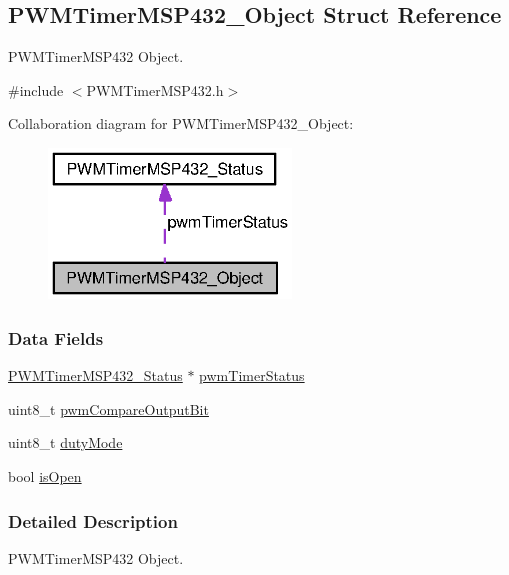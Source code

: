 \subsection{P\+W\+M\+Timer\+M\+S\+P432\+\_\+\+Object Struct Reference}
\label{struct_p_w_m_timer_m_s_p432___object}


P\+W\+M\+Timer\+M\+S\+P432 Object.  




{\ttfamily \#include $<$P\+W\+M\+Timer\+M\+S\+P432.\+h$>$}



Collaboration diagram for P\+W\+M\+Timer\+M\+S\+P432\+\_\+\+Object\+:
\nopagebreak
\begin{figure}[H]
\begin{center}
\leavevmode
\includegraphics[width=183pt]{struct_p_w_m_timer_m_s_p432___object__coll__graph}
\end{center}
\end{figure}
\subsubsection*{Data Fields}
\begin{DoxyCompactItemize}
\item 
\hyperlink{struct_p_w_m_timer_m_s_p432___status}{P\+W\+M\+Timer\+M\+S\+P432\+\_\+\+Status} $\ast$ \hyperlink{struct_p_w_m_timer_m_s_p432___object_a231a0572fd3ba5cd186bd8eda0a88b57}{pwm\+Timer\+Status}
\item 
uint8\+\_\+t \hyperlink{struct_p_w_m_timer_m_s_p432___object_a1f430a602edafc21e87a239aae9acb00}{pwm\+Compare\+Output\+Bit}
\item 
uint8\+\_\+t \hyperlink{struct_p_w_m_timer_m_s_p432___object_a307ec337c696a69a3422ef7eabbc789d}{duty\+Mode}
\item 
bool \hyperlink{struct_p_w_m_timer_m_s_p432___object_a5001919cd7ccf92f6827ab7ad28a733c}{is\+Open}
\end{DoxyCompactItemize}


\subsubsection{Detailed Description}
P\+W\+M\+Timer\+M\+S\+P432 Object. 

